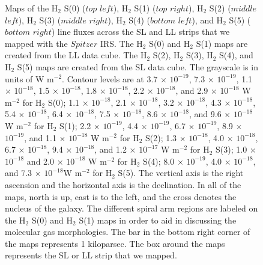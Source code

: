 \documentclass[manuscript]{aastex}
\begin{document}
\clearpage


\begin{figure}
 \end{figure}
 \clearpage
 
 \begin{figure}
 \caption{Maps of the H$_2$ S(0) ($top$ $left$), H$_2$ S(1)
 ($top$ $right$), H$_2$ S(2) ($middle$ $left$), H$_2$ S(3) 
 ($middle$ $right$), H$_2$ S(4) ($bottom$ $left$), and H$_2$ 
 S(5) ($bottom$ $right$) line fluxes across the SL and LL strips that we mapped 
 with the $Spitzer$ IRS.  The H$_2$ S(0) and H$_2$ S(1) 
 maps are created from the LL data cube.    
The H$_2$ S(2), H$_2$ S(3), H$_2$ S(4), and 
H$_2$ S(5) maps are created from the SL data cube.  
The grayscale is in units of W $\mathrm{m^{-2}}$.  Contour levels are at 
3.7 $\times$ ${10^{-19}}$, 7.3 $\times$ ${10^{-19}}$, 1.1 $\times$ ${10^{-18}}$, 1.5 $\times$ ${10^{-18}}$, 1.8 $\times$ ${10^{-18}}$, 2.2 $\times$ ${10^{-18}}$, and 2.9 $\times$ ${10^{-18}}$ W $\mathrm{m^{-2}}$ for H$_2$ S(0); 
1.1 $\times$ ${10^{-18}}$, 2.1 $\times$ ${10^{-18}}$, 3.2 $\times$ ${10^{-18}}$, 4.3 $\times$ ${10^{-18}}$, 5.4 $\times$ ${10^{-18}}$, 6.4 $\times$ ${10^{-18}}$, 7.5 $\times$ ${10^{-18}}$, 8.6 $\times$ ${10^{-18}}$, and 9.6 $\times$ ${10^{-18}}$ W $\mathrm{m^{-2}}$ for H$_2$ S(1); 
2.2 $\times$ ${10^{-19}}$, 4.4 $\times$ ${10^{-19}}$,  6.7 $\times$ ${10^{-19}}$, 8.9 $\times$ ${10^{-19}}$, and 1.1 $\times$ ${10^{-18}}$ W $\mathrm{m^{-2}}$ for H$_2$ S(2);
1.3 $\times$ ${10^{-18}}$, 4.0 $\times$ ${10^{-18}}$, 6.7 $\times$ ${10^{-18}}$, 9.4 $\times$ ${10^{-18}}$, and 1.2 $\times$ ${10^{-17}}$ W $\mathrm{m^{-2}}$ for H$_2$ S(3);  
1.0 $\times$ ${10^{-18}}$ and 2.0 $\times$ ${10^{-18}}$ W $\mathrm{m^{-2}}$ for H$_2$ S(4); 
8.0 $\times$ ${10^{-19}}$, 4.0 $\times$ ${10^{-18}}$, and 7.3 $\times$ ${10^{-18}}$W $\mathrm{m^{-2}}$ for H$_2$ S(5).  
The vertical axis is the right ascension and the horizontal axis is the declination.  
In all of the maps, north is up, east is to the left, and the cross 
denotes the nucleus of the galaxy.  The different spiral 
arm regions are labeled on the H$_2$ S(0) and H$_2$ S(1) 
maps in order to aid in discussing the molecular gas morphologies.  
The bar in the bottom right corner of the maps 
represents 1 kiloparsec.  The box around 
the maps represents the SL or LL strip that we mapped.}
  \label{figure-2}
  \end{figure}
\end{document}
